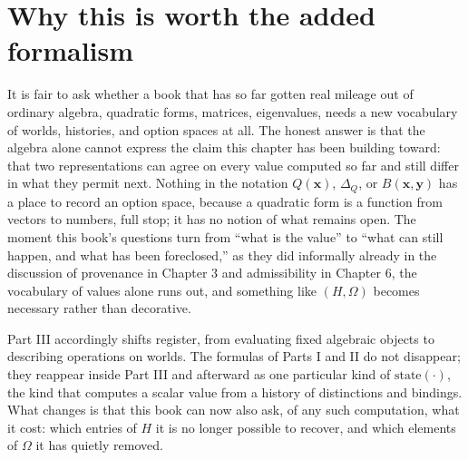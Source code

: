 \documentclass[11pt]{book}
\begin{document}
\section{Why this is worth the added formalism}

It is fair to ask whether a book that has so far gotten real mileage out of ordinary algebra, quadratic forms, matrices, eigenvalues, needs a new vocabulary of worlds, histories, and option spaces at all. The honest answer is that the algebra alone cannot express the claim this chapter has been building toward: that two representations can agree on every value computed so far and still differ in what they permit next. Nothing in the notation $Q(\mathbf{x})$, $\Delta_Q$, or $B(\mathbf{x},\mathbf{y})$ has a place to record an option space, because a quadratic form is a function from vectors to numbers, full stop; it has no notion of what remains open. The moment this book's questions turn from ``what is the value'' to ``what can still happen, and what has been foreclosed,'' as they did informally already in the discussion of provenance in Chapter 3 and admissibility in Chapter 6, the vocabulary of values alone runs out, and something like $(H,\Omega)$ becomes necessary rather than decorative.

Part III accordingly shifts register, from evaluating fixed algebraic objects to describing operations on worlds. The formulas of Parts I and II do not disappear; they reappear inside Part III and afterward as one particular kind of $\mathrm{state}(\cdot)$, the kind that computes a scalar value from a history of distinctions and bindings. What changes is that this book can now also ask, of any such computation, what it cost: which entries of $H$ it is no longer possible to recover, and which elements of $\Omega$ it has quietly removed.
\end{document}
